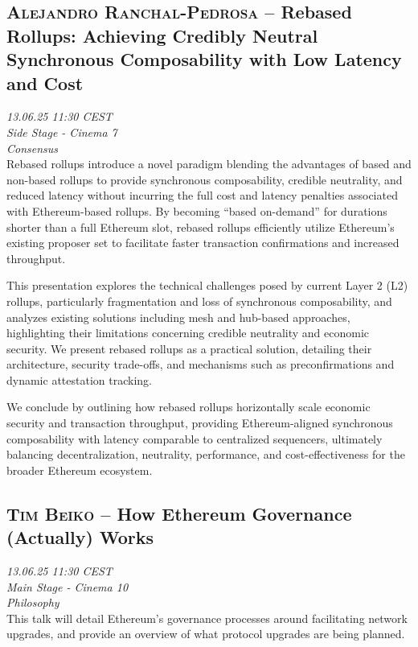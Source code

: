 \clearpage
\subsection {\textsc{Alejandro Ranchal-Pedrosa}  -- Rebased Rollups: Achieving Credibly Neutral Synchronous Composability with Low Latency and Cost} \noindent \textit {13.06.25 11:30 CEST\\ Side Stage - Cinema 7\\ Consensus}\\[1em] Rebased rollups introduce a novel paradigm blending the advantages of based and non-based rollups to provide synchronous composability, credible neutrality, and reduced latency without incurring the full cost and latency penalties associated with Ethereum-based rollups. By becoming ``based on-demand'' for durations shorter than a full Ethereum slot, rebased rollups efficiently utilize Ethereum’s existing proposer set to facilitate faster transaction confirmations and increased throughput.

This presentation explores the technical challenges posed by current Layer 2 (L2) rollups, particularly fragmentation and loss of synchronous composability, and analyzes existing solutions including mesh and hub-based approaches, highlighting their limitations concerning credible neutrality and economic security. We present rebased rollups as a practical solution, detailing their architecture, security trade-offs, and mechanisms such as preconfirmations and dynamic attestation tracking.

We conclude by outlining how rebased rollups horizontally scale economic security and transaction throughput, providing Ethereum-aligned synchronous composability with latency comparable to centralized sequencers, ultimately balancing decentralization, neutrality, performance, and cost-effectiveness for the broader Ethereum ecosystem.

\clearpage
\subsection {\textsc{Tim Beiko}  -- How Ethereum Governance (Actually) Works} \noindent \textit {13.06.25 11:30 CEST\\ Main Stage - Cinema 10\\ Philosophy}\\[1em] This talk will detail Ethereum's governance processes around facilitating network upgrades, and provide an overview of what protocol upgrades are being planned.

